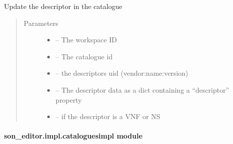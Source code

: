 \documentclass[letterpaper,10pt,english]{sphinxmanual}
\begin{document}

\begin{fulllineitems}
\label{_source/son_editor.impl:son_editor.impl.catalogue_servicesimpl.update_service_catalogue}
Update the descriptor in the catalogue
\begin{quote}\begin{description}
\item[{Parameters}] \leavevmode\begin{itemize}
\item {} 
 -- The workspace ID

\item {} 
 -- The catalogue id

\item {} 
 -- the descriptors uid (vendor:name:version)

\item {} 
 -- The descriptor data as a dict containing a ``descriptor'' property

\item {} 
 -- if the descriptor is a VNF or NS

\end{itemize}

\end{description}\end{quote}

\end{fulllineitems}



\paragraph{son\_editor.impl.cataloguesimpl module}
\label{_source/son_editor.impl:son-editor-impl-cataloguesimpl-module}\label{_source/son_editor.impl:module-son_editor.impl.cataloguesimpl}
\end{document}
